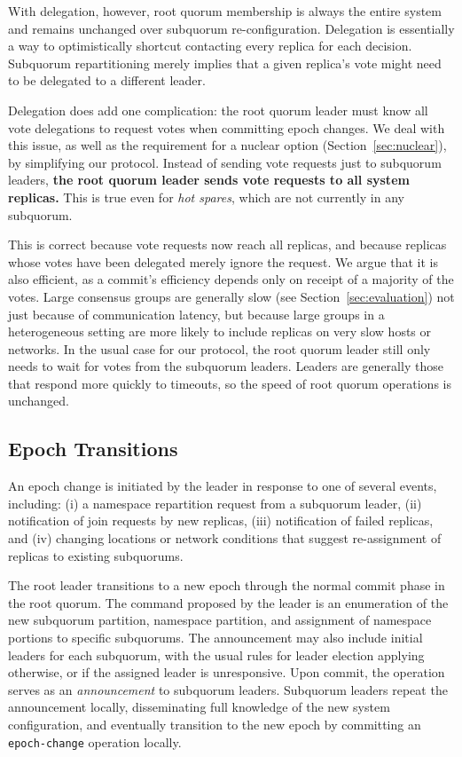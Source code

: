 \documentclass[letterpaper,10pt,twocolumn]{article}
\newcommand{\sub}{subquorum\xspace}
\newcommand{\Sub}{Subquorum\xspace}
\newcommand{\subs}{subquorums\xspace}
\newcommand{\roo}{root quorum\xspace}
\begin{document}
With delegation, however, \roo membership is always the entire system and remains
unchanged over \sub re-configuration.
Delegation is essentially a way to optimistically shortcut contacting every
replica for each decision.
\Sub repartitioning merely implies that a given replica's vote might need to be
delegated to a different leader.

Delegation does add one complication: the \roo leader must know all
vote delegations to request votes when committing epoch changes.
We deal with this issue, as well as the requirement for a nuclear option
(Section~\ref{sec:nuclear}), by simplifying our protocol.
Instead of sending vote requests just to \sub leaders,
 \textbf{the \roo leader sends vote requests to all system replicas.}
This is true even for \emph{hot spares}, which are not currently in any
\sub.

This is correct because vote requests now reach all replicas, and because
replicas whose votes have been delegated merely ignore the request.
We argue that it is also efficient, as a commit's efficiency depends only on
receipt of a majority of the votes.
Large consensus groups are generally slow (see Section~\ref{sec:evaluation})
not just because of communication latency, but because large groups in a
heterogeneous setting are more likely to include replicas on very slow hosts
or networks.
In the usual case for our protocol, the \roo leader still only needs to wait
for votes from the \sub leaders.
Leaders are generally those that respond more quickly to timeouts, so the
speed of \roo operations is unchanged.

\subsection{Epoch Transitions}
An epoch change is initiated by the leader in response to one of several events,
including: (i) a namespace repartition request from a \sub leader, (ii) notification of join requests
by new replicas, (iii) notification of failed replicas, and (iv) changing locations or
network conditions that suggest re-assignment of replicas to existing \subs.

The root leader transitions to a new epoch through the normal commit phase in
the \roo.
The command proposed by the leader is an enumeration of the new \sub
partition, namespace partition, and assignment of namespace portions to
specific \subs.
The announcement may also include initial leaders for each \sub, with the
usual rules for leader election applying otherwise, or if the assigned leader
is unresponsive.
Upon commit, the operation serves as an \emph{announcement} to \sub leaders.
\Sub leaders repeat the announcement locally, disseminating full knowledge of
the new system configuration, and eventually transition to the new epoch by
committing an \texttt{epoch-change} operation locally.
\end{document}
